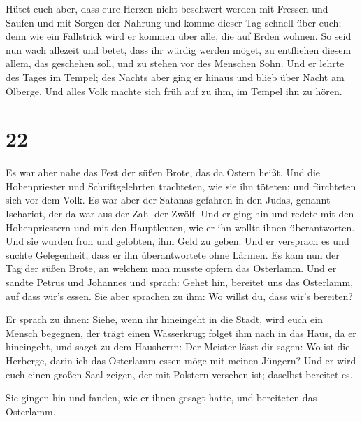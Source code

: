  Hütet euch aber, dass eure Herzen nicht beschwert werden
mit Fressen und Saufen und mit Sorgen der Nahrung und komme dieser Tag
schnell über euch;  denn wie ein Fallstrick wird er
kommen über alle, die auf Erden wohnen.  So seid nun wach
allezeit und betet, dass ihr würdig werden möget, zu entfliehen diesem
allem, das geschehen soll, und zu stehen vor des Menschen Sohn.
 Und er lehrte des Tages im Tempel; des Nachts aber ging
er hinaus und blieb über Nacht am Ölberge.  Und alles
Volk machte sich früh auf zu ihm, im Tempel ihn zu hören.

\hypertarget{section-21}{%
\section{22}\label{section-21}}

 Es war aber nahe das Fest der süßen Brote, das da Ostern
heißt.  Und die Hohenpriester und Schriftgelehrten
trachteten, wie sie ihn töteten; und fürchteten sich vor dem Volk.
 Es war aber der Satanas gefahren in den Judas, genannt
Ischariot, der da war aus der Zahl der Zwölf.  Und er ging
hin und redete mit den Hohenpriestern und mit den Hauptleuten, wie er
ihn wollte ihnen überantworten.  Und sie wurden froh und
gelobten, ihm Geld zu geben.  Und er versprach es und
suchte Gelegenheit, dass er ihn überantwortete ohne Lärmen.
 Es kam nun der Tag der süßen Brote, an welchem man musste
opfern das Osterlamm.  Und er sandte Petrus und Johannes
und sprach: Gehet hin, bereitet uns das Osterlamm, auf dass wir's essen.
 Sie aber sprachen zu ihm: Wo willst du, dass wir's
bereiten?

 Er sprach zu ihnen: Siehe, wenn ihr hineingeht in die
Stadt, wird euch ein Mensch begegnen, der trägt einen Wasserkrug; folget
ihm nach in das Haus, da er hineingeht,  und saget zu dem
Hausherrn: Der Meister lässt dir sagen: Wo ist die Herberge, darin ich
das Osterlamm essen möge mit meinen Jüngern?  Und er wird
euch einen großen Saal zeigen, der mit Polstern versehen ist; daselbst
bereitet es.

 Sie gingen hin und fanden, wie er ihnen gesagt hatte,
und bereiteten das Osterlamm.

